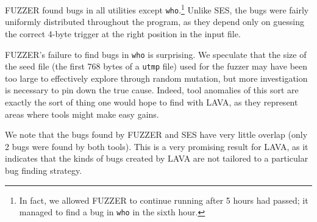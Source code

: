FUZZER found bugs in all utilities except \verb+who+.\footnote{In fact, we allowed FUZZER to continue running after 5 hours had passed; it managed to find a bug in \texttt{who} in the sixth hour.}
Unlike SES, the bugs were fairly uniformly distributed throughout the program, as they depend only on guessing the correct 4-byte trigger at the right position in the input file.

FUZZER's failure to find bugs in \verb+who+ is surprising.
We speculate that the size of the seed file (the first 768 bytes of a \verb+utmp+ file) used for the fuzzer may have been too large to effectively explore through random mutation, but more investigation is necessary to pin down the true cause.
Indeed, tool anomalies of this sort are exactly the sort of thing one would hope to find with LAVA, as they represent areas where tools might make easy gains.

We note that the bugs found by FUZZER and SES have very little overlap (only 2 bugs were found by both tools).
This is a very promising result for LAVA, as it indicates that the kinds of bugs created by LAVA are not tailored to a particular bug finding strategy.


